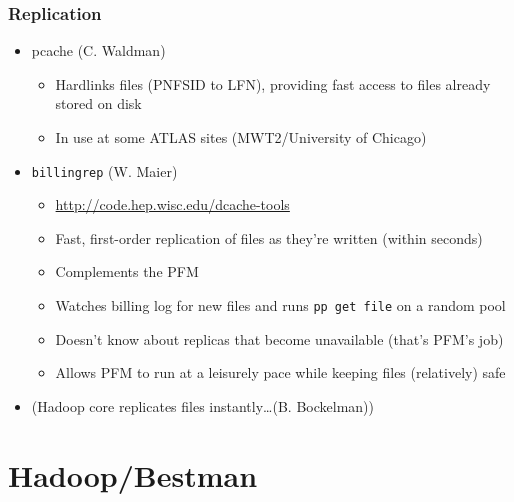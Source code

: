 \documentclass{beamer}
\begin{document}
\begin{frame}
\frametitle{Replication}
\begin{itemize}
	\item pcache (C. Waldman)
	\begin{itemize}
		\item Hardlinks files (PNFSID to LFN), providing fast access to files already stored on disk
		\item In use at some ATLAS sites (MWT2/University of Chicago)
	\end{itemize}
	\item {\tt billingrep} (W. Maier)
	\begin{itemize}
		\item \url{http://code.hep.wisc.edu/dcache-tools}
		\item Fast, first-order replication of files as they're written (within seconds)
		\item Complements the PFM
		\item Watches billing log for new files and runs {\tt pp get file} on a random pool
		\item Doesn't know about replicas that become unavailable (that's PFM's job)
		\item Allows PFM to run at a leisurely pace while keeping files (relatively) safe
	\end{itemize}
	\item {\small{(Hadoop core replicates files instantly\ldots{}(B. Bockelman))}}
\end{itemize}
\end{frame}

\section{Hadoop/Bestman}
\end{document}

